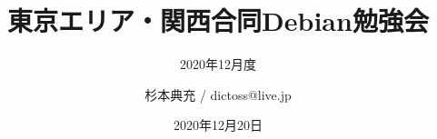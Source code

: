 \title{東京エリア・関西合同Debian勉強会}
\subtitle{2020年12月度} %
\author{杉本典充 / dictoss@live.jp}
\date{2020年12月20日}



\begin{frame}
\titlepage{}
\end{frame}


